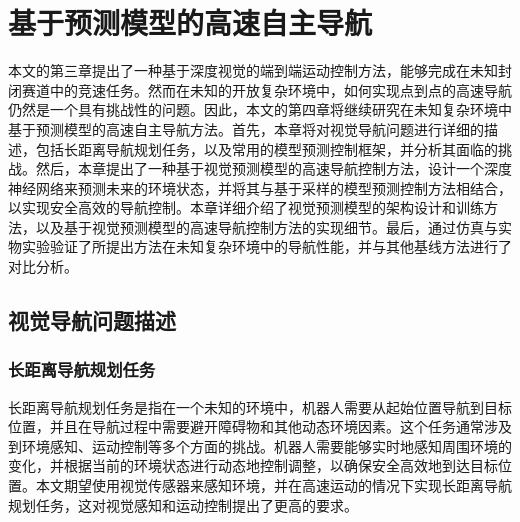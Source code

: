\chapter{基于预测模型的高速自主导航}
本文的第三章提出了一种基于深度视觉的端到端运动控制方法，能够完成在未知封闭赛道中的竞速任务。然而在未知的开放复杂环境中，如何实现点到点的高速导航仍然是一个具有挑战性的问题。因此，本文的第四章将继续研究在未知复杂环境中基于预测模型的高速自主导航方法。首先，本章将对视觉导航问题进行详细的描述，包括长距离导航规划任务，以及常用的模型预测控制框架，并分析其面临的挑战。然后，本章提出了一种基于视觉预测模型的高速导航控制方法，设计一个深度神经网络来预测未来的环境状态，并将其与基于采样的模型预测控制方法相结合，以实现安全高效的导航控制。本章详细介绍了视觉预测模型的架构设计和训练方法，以及基于视觉预测模型的高速导航控制方法的实现细节。最后，通过仿真与实物实验验证了所提出方法在未知复杂环境中的导航性能，并与其他基线方法进行了对比分析。
\section{视觉导航问题描述}
\subsection{长距离导航规划任务}
长距离导航规划任务是指在一个未知的环境中，机器人需要从起始位置导航到目标位置，并且在导航过程中需要避开障碍物和其他动态环境因素。这个任务通常涉及到环境感知、运动控制等多个方面的挑战。机器人需要能够实时地感知周围环境的变化，并根据当前的环境状态进行动态地控制调整，以确保安全高效地到达目标位置。本文期望使用视觉传感器来感知环境，并在高速运动的情况下实现长距离导航规划任务，这对视觉感知和运动控制提出了更高的要求。

